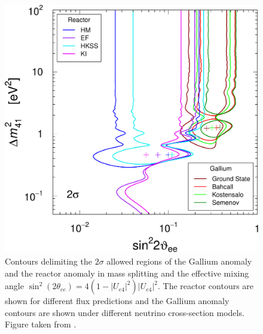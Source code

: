 \begin{figure}
    \centering
    \includegraphics[width=0.7\linewidth]{figures/theory/see-gal-rat-2s.pdf}
    \caption{Contours delimiting the $2\sigma$ allowed regions of the Gallium anomaly and the reactor anomaly in mass splitting and the effective mixing angle $\sin^2(2\theta_{ee}) = 4 (1-|U_{e4}|^2)|U_{e4}|^2$. The reactor contours are shown for different flux predictions and the Gallium anomaly contours are shown under different neutrino cross-section models. Figure taken from \cite{Giunti_2022}.\label{fig:best-contours}}
\end{figure}

